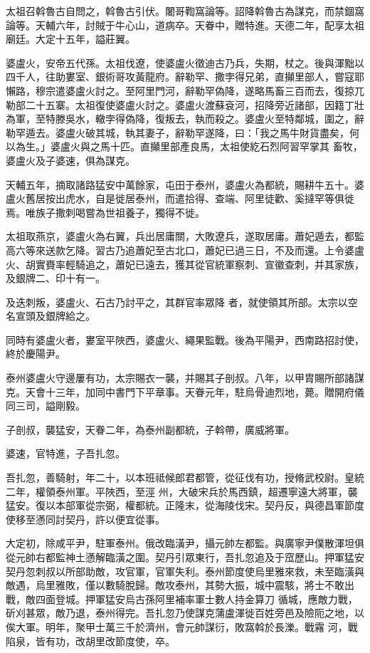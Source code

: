 \begin{pinyinscope}
 太祖召斡魯古自問之，斡魯古引伏。闍哥鞫窩論等。詔降斡魯古為謀克，而禁錮窩論等。天輔六年，討賊于牛心山，道病卒。天眷中，贈特進。天德二年，配享太祖廟廷。大定十五年，謚莊翼。



 婆盧火，安帝五代孫。太祖伐遼，使婆盧火徵迪古乃兵，失期，杖之。後與渾黜以四千人，往助婁室、銀術哥攻黃龍府。辭勒罕、撒孛得兄弟，直攧里部人，嘗寇耶懶路，穆宗遣婆盧火討之。至阿里門河，辭勒罕偽降，遂略馬畜三百而去，復掠兀勒部二十五寨。太祖復使婆盧火討之。婆盧火渡蘇袞河，招降旁近諸部，因籍丁壯為軍，至特滕吳水，轍孛得偽降，復叛去，執而殺之。婆盧火至特鄰城，圍之，辭勒罕遁去。婆盧火破其城，執其妻子，辭勒罕遂降，曰：「我之馬牛財貨盡矣，何以為生。」婆盧火與之馬十匹。直攧里部產良馬，太祖使紇石烈阿習罕掌其
 畜牧，婆盧火及子婆速，俱為謀克。



 天輔五年，摘取諸路猛安中萬餘家，屯田于泰州，婆盧火為都統，賜耕牛五十。婆盧火舊居按出虎水，自是徙居泰州，而遣拾得、查端、阿里徒歡、奚撻罕等俱徙焉。唯族子撒刺喝嘗為世祖養子，獨得不徙。



 太祖取燕京，婆盧火為右翼，兵出居庸關，大敗遼兵，遂取居庸。蕭妃遁去，都監高六等來送款乞降。習古乃追蕭妃至古北口，蕭妃已過三日，不及而還。上令婆盧火、胡實賚率輕騎追之，蕭妃已遠去，獲其從官統軍察刺、宣徽查刺，并其家族，及銀牌二、印十有一。



 及迭刺叛，婆盧火、石古乃討平之，其群官率眾降
 者，就使領其所部。太宗以空名宣頭及銀牌給之。



 同時有婆盧火者，婁室平陜西，婆盧火、繩果監戰。後為平陽尹，西南路招討使，終於慶陽尹。



 泰州婆盧火守邊屢有功，太宗賜衣一襲，并賜其子剖叔。八年，以甲胄賜所部諸謀克。天會十三年，加同中書門下平章事。天眷元年，駐烏骨迪烈地，薨。贈開府儀同三司，謚剛毅。



 子剖叔，襲猛安，天眷二年，為泰州副都統，子斡帶，廣威將軍。



 婆速，官特進，子吾扎忽。



 吾扎忽，善騎射，年二十，以本班祗候郎君都管，從征伐有功，授脩武校尉。皇統二年，權領泰州軍。平陜西，至涇
 州，大破宋兵於馬西鎮，超遷寧遠大將軍，襲猛安。復以本部軍從宗弼，權都統。正隆末，從海陵伐宋。契丹反，與德昌軍節度使移至懣同討契丹，許以便宜從事。


大定初，除咸平尹，駐軍泰州。俄改臨潢尹，攝元帥左都監。與廣寧尹僕散渾坦俱從元帥右都監神土懣解臨潢之圍。契丹引眾東行，吾扎忽追及于窊歷山。押軍猛安契丹忽刺叔以所部助敵，攻官軍，官軍失利。泰州節度使烏里雅來救，未至臨潢與敵遇，烏里雅敗，僅以數騎脫歸。敵攻泰州，其勢大振，城中震駭，將士不敢出戰，敵四面登城。押軍猛安烏古孫阿里補率軍士數人持金算刀
 循城，應敵力戰，斫刈甚眾，敵乃退，泰州得完。吾扎忽乃使謀克蒲盧渾徙百姓旁邑及險阨之地，以俟大軍。明年，聚甲士萬三千於濟州，會元帥謀衍，敗窩斡於長濼。戰霿
 河，戰陷泉，皆有功，改胡里改節度使，卒。




\end{pinyinscope}
